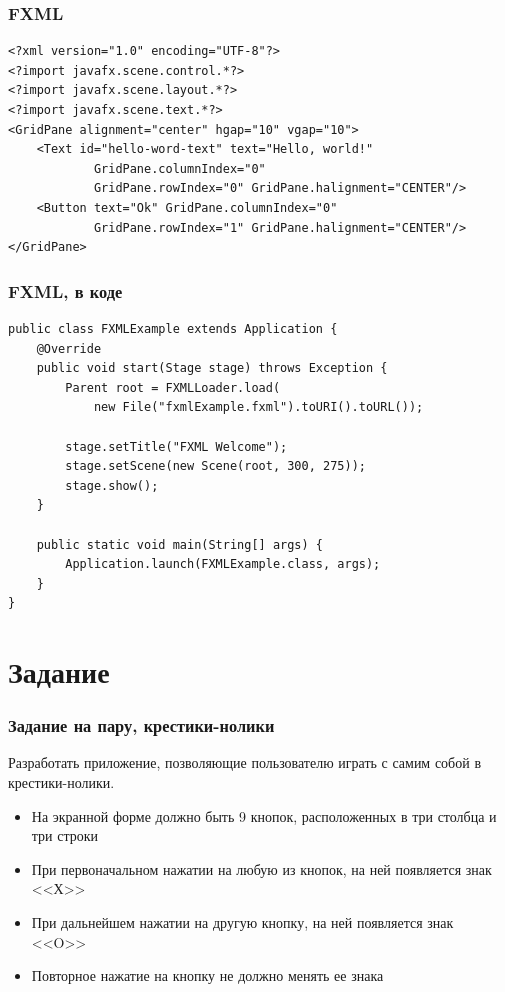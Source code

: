 \documentclass[xetex,mathserif,serif]{beamer}
\begin{document}
	\begin{frame}[fragile]
		\frametitle{FXML}
		\begin{verbatim}
<?xml version="1.0" encoding="UTF-8"?>
<?import javafx.scene.control.*?>
<?import javafx.scene.layout.*?>
<?import javafx.scene.text.*?>
<GridPane alignment="center" hgap="10" vgap="10">
    <Text id="hello-word-text" text="Hello, world!"
            GridPane.columnIndex="0"
            GridPane.rowIndex="0" GridPane.halignment="CENTER"/>
    <Button text="Ok" GridPane.columnIndex="0"
            GridPane.rowIndex="1" GridPane.halignment="CENTER"/>
</GridPane>
		\end{verbatim}
\end{frame}

	\begin{frame}[fragile]
		\frametitle{FXML, в коде}
		\begin{verbatim}
public class FXMLExample extends Application {
    @Override
    public void start(Stage stage) throws Exception {
        Parent root = FXMLLoader.load(
            new File("fxmlExample.fxml").toURI().toURL());

        stage.setTitle("FXML Welcome");
        stage.setScene(new Scene(root, 300, 275));
        stage.show();
    }

    public static void main(String[] args) {
        Application.launch(FXMLExample.class, args);
    }
}
		\end{verbatim}
	\end{frame}

	\section{Задание}

	\begin{frame}
		\frametitle{Задание на пару, крестики-нолики}
		Разработать приложение, позволяющие пользователю играть с самим собой в крестики-нолики. 
		\begin{itemize}
			\item На экранной форме должно быть 9 кнопок, расположенных в три столбца и три строки
			\item При первоначальном нажатии на любую из кнопок, на ней появляется знак <<Х>> 
			\item При дальнейшем нажатии на другую кнопку, на ней появляется знак <<O>>
			\item Повторное нажатие на кнопку не должно менять ее знака
		\end{itemize}
	\end{frame}
\end{document}
